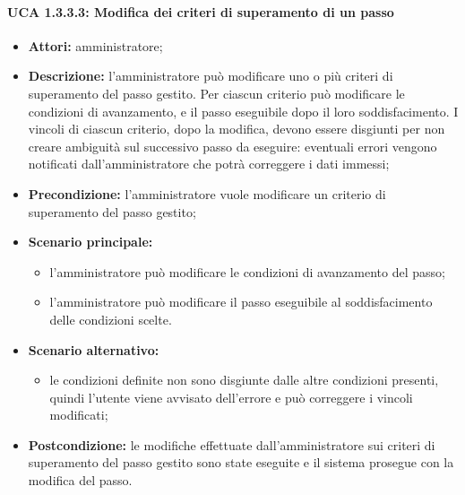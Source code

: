 \paragraph{UCA 1.3.3.3: Modifica dei criteri di superamento di un passo}
\begin{itemize}
\item \textbf{Attori:} 
amministratore;
\item \textbf{Descrizione:} 
l'amministratore può modificare uno o più criteri di superamento del passo gestito.
Per ciascun criterio può modificare le condizioni di avanzamento, e il passo eseguibile dopo il loro soddisfacimento.
I vincoli di ciascun criterio, dopo la modifica, devono essere disgiunti per non creare ambiguità sul successivo passo da eseguire: eventuali
errori vengono notificati dall'amministratore che potrà correggere i dati immessi;
\item \textbf{Precondizione:}
l'amministratore vuole modificare un criterio di superamento del passo gestito;
\item \textbf{Scenario principale:} 
\begin{itemize}
\item l'amministratore può modificare le condizioni di avanzamento del passo;
\item l'amministratore può modificare il passo eseguibile al soddisfacimento delle condizioni scelte.
\end{itemize}
\item \textbf{Scenario alternativo:}
\begin{itemize}
\item le condizioni definite non sono disgiunte dalle altre condizioni presenti, quindi l'utente viene avvisato dell'errore e può correggere i vincoli modificati;
\end{itemize}
\item \textbf{Postcondizione:}
le modifiche effettuate dall'amministratore sui criteri di superamento del passo gestito sono state eseguite e il sistema prosegue con la modifica del passo. 
\end{itemize}

